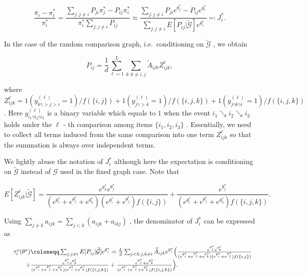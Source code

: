 \[
\frac{\bar{\pi}_{i} - \pi_{i}^{*}}{\pi_{i}^{*}} = \frac{\sum_{j:j\neq i}P_{ji}\pi_{j}^{*} - P_{ij}\pi_{i}^{*}}{\pi_{i}^{*}\sum_{j:j\neq i}P_{ij}}\approx \frac{\sum_{j:j\neq i}P_{ji}e^{\theta_{j}^{*}} - P_{ij}e^{\theta_{i}^{*}}}{\sum_{j:j\neq i}E[P_{ij}|\widetilde{\mathcal{G}}]e^{\theta_{i}^{*}}} \eqqcolon J_{i}^{*}. \tag{3.6}
\]

In the case of the random comparison graph, i.e.~conditioning on
\(\widetilde{\mathcal{G}}\) , we obtain

\[
P_{ij} = \frac{1}{d}\sum_{\ell = 1}^{L}\sum_{k:k\neq i,j}\widetilde{A}_{ijk}Z_{ijk}^{\ell}, \tag{3.7}
\]

where
\(Z_{ijk}^{\ell} = 1(y_{k\gamma >j > i}^{(\ell)} = 1) / f(\{i,j\}) + 1(y_{j\gamma >k}^{(\ell)} = 1) / f(\{i,j,k\}) + 1(y_{j\gamma k\gamma i}^{(\ell)} = 1) / f(\{i,j,k\})\)
. Here \(y_{i_1\gamma i_2\gamma i_3}^{(\ell)}\) is a binary variable
which equals to \(1\) when the event \(i_1\searrow i_2\searrow i_3\)
holds under the \(\ell\) - th comparison among items \(\{i_1,i_2,i_3\}\)
. Essentially, we need to collect all terms induced from the same
comparison into one term \(Z_{ijk}^{\ell}\) so that the summation is
always over independent terms.

We lightly abuse the notation of \(J_{i}^{*}\) although here the
expectation is conditioning on \(\widetilde{\mathcal{G}}\) instead of
\(\mathcal{G}\) used in the fixed graph case. Note that

\[
E[Z_{ijk}^{\ell}|\widetilde{\mathcal{G}} ] = \frac{e^{\theta_{k}^{*}}e^{\theta_{j}^{*}}}{(e^{\theta_{i}^{*}} + e^{\theta_{j}^{*}} + e^{\theta_{k}^{*}})(e^{\theta_{i}^{*}} + e^{\theta_{j}^{*}})f(\{i,j\})} +\frac{e^{\theta_{j}^{*}}}{(e^{\theta_{i}^{*}} + e^{\theta_{j}^{*}} + e^{\theta_{k}^{*}})f(\{i,j,k\})}.
\]

Using \(\sum_{j\neq k}a_{ijk} = \sum_{j< k}(a_{ijk} + a_{ikj})\) , the
denominator of \(J_{i}^{*}\) can be expressed as

\[
\begin{array}{r l} & {\tau_{i}^{\diamond}(\theta^{*})\coloneqq \sum_{j:j\neq i}E[P_{i j}|\widetilde{\mathcal{G}} ]e^{\theta_{i}^{*}} = \frac{L}{d}\sum_{j< k:j,k\neq i}\widetilde{A}_{i j k}e^{\theta_{i}^{*}}\Big(\frac{e^{\theta_{j}^{*}}e^{\theta_{k}^{*}}}{(e^{\theta_{i}^{*}} + e^{\theta_{j}^{*}} + e^{\theta_{k}^{*}})(e^{\theta_{i}^{*}} + e^{\theta_{j}^{*}})f(\{i,j\})}}\\ & {\qquad +\frac{e^{\theta_{j}^{*}}e^{\theta_{k}^{*}}}{(e^{\theta_{i}^{*}} + e^{\theta_{j}^{*}} + e^{\theta_{k}^{*}})(e^{\theta_{i}^{*}} + e^{\theta_{k}^{*}})f(\{i,j,k\})} +\frac{e^{\theta_{j}^{*}} + e^{\theta_{k}^{*}}}{(e^{\theta_{i}^{*}} + e^{\theta_{j}^{*}} + e^{\theta_{k}^{*}})f(\{i,j,k\})}\Big).} \end{array}
\]

